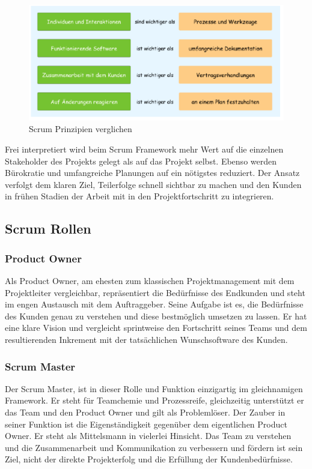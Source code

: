 \begin{figure}[!htb]
  \centering
  \includegraphics[width=1\textwidth]{figures/daniel/Bild-1.png}
  \caption[]{Scrum Prinzipien verglichen}
  \label{fig:scrum_prinzipien}
\end{figure}

Frei interpretiert wird beim Scrum Framework mehr Wert auf die einzelnen Stakeholder des Projekts gelegt als auf das Projekt selbst. Ebenso werden Bürokratie und umfangreiche Planungen auf ein nötigstes reduziert. Der Ansatz verfolgt dem klaren Ziel, Teilerfolge schnell sichtbar zu machen und den Kunden in frühen Stadien der Arbeit mit in den Projektfortschritt zu integrieren. 

\subsection{Scrum Rollen}
\subsubsection{Product Owner}
Als Product Owner, am ehesten zum klassischen Projektmanagement mit dem Projektleiter vergleichbar, repräsentiert die Bedürfnisse des Endkunden und steht im engen Austausch mit dem Auftraggeber. Seine Aufgabe ist es, die Bedürfnisse des Kunden genau zu verstehen und diese bestmöglich umsetzen zu lassen. Er hat eine klare Vision und vergleicht sprintweise den Fortschritt seines Teams und dem resultierenden Inkrement mit der tatsächlichen Wunschsoftware des Kunden. 

\subsubsection{Scrum Master}
Der Scrum Master, ist in dieser Rolle und Funktion einzigartig im gleichnamigen Framework. Er steht für Teamchemie und Prozessreife, gleichzeitig unterstützt er das Team und den Product Owner und gilt als Problemlöser. Der Zauber in seiner Funktion ist die Eigenständigkeit gegenüber dem eigentlichen Product Owner. Er steht als Mittelsmann in vielerlei Hinsicht. Das Team zu verstehen und die Zusammenarbeit und Kommunikation zu verbessern und fördern ist sein Ziel, nicht der direkte Projekterfolg und die Erfüllung der Kundenbedürfnisse.

